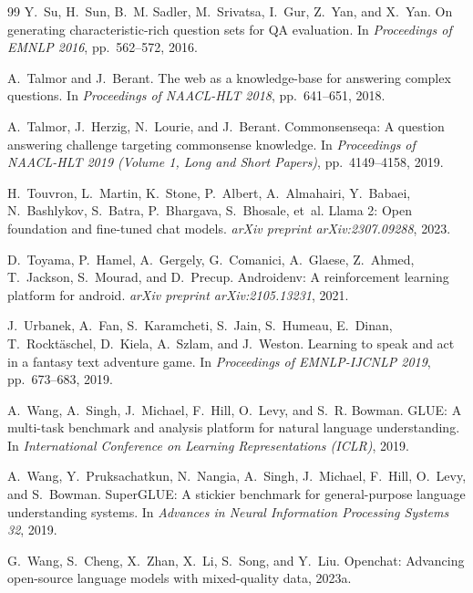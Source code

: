 \begin{thebibliography}{99}
Y.~Su, H.~Sun, B.~M. Sadler, M.~Srivatsa, I.~Gur, Z.~Yan, and X.~Yan.
\newblock On generating characteristic-rich question sets for QA
evaluation.
\newblock In \emph{Proceedings of EMNLP 2016}, pp.\ 562--572, 2016.

A.~Talmor and J.~Berant.
\newblock The web as a knowledge-base for answering complex questions.
\newblock In \emph{Proceedings of NAACL-HLT 2018}, pp.\ 641--651, 2018.

A.~Talmor, J.~Herzig, N.~Lourie, and J.~Berant.
\newblock Commonsenseqa: A question answering challenge targeting
commonsense knowledge.
\newblock In \emph{Proceedings of NAACL-HLT 2019 (Volume 1, Long and Short
Papers)}, pp.\ 4149--4158, 2019.

H.~Touvron, L.~Martin, K.~Stone, P.~Albert, A.~Almahairi, Y.~Babaei,
N.~Bashlykov, S.~Batra, P.~Bhargava, S.~Bhosale, et~al.
\newblock Llama 2: Open foundation and fine-tuned chat models.
\newblock \emph{arXiv preprint arXiv:2307.09288}, 2023.

D.~Toyama, P.~Hamel, A.~Gergely, G.~Comanici, A.~Glaese, Z.~Ahmed,
T.~Jackson, S.~Mourad, and D.~Precup.
\newblock Androidenv: A reinforcement learning platform for android.
\newblock \emph{arXiv preprint arXiv:2105.13231}, 2021.

J.~Urbanek, A.~Fan, S.~Karamcheti, S.~Jain, S.~Humeau, E.~Dinan,
T.~Rockt\"aschel, D.~Kiela, A.~Szlam, and J.~Weston.
\newblock Learning to speak and act in a fantasy text adventure game.
\newblock In \emph{Proceedings of EMNLP-IJCNLP 2019}, pp.\ 673--683, 2019.

A.~Wang, A.~Singh, J.~Michael, F.~Hill, O.~Levy, and S.~R. Bowman.
\newblock GLUE: A multi-task benchmark and analysis platform for natural
language understanding.
\newblock In \emph{International Conference on Learning Representations
(ICLR)}, 2019.

A.~Wang, Y.~Pruksachatkun, N.~Nangia, A.~Singh, J.~Michael, F.~Hill,
O.~Levy, and S.~Bowman.
\newblock SuperGLUE: A stickier benchmark for general-purpose language
understanding systems.
\newblock In \emph{Advances in Neural Information Processing Systems 32},
2019.

G.~Wang, S.~Cheng, X.~Zhan, X.~Li, S.~Song, and Y.~Liu.
\newblock Openchat: Advancing open-source language models with
mixed-quality data, 2023a.


\end{thebibliography}
